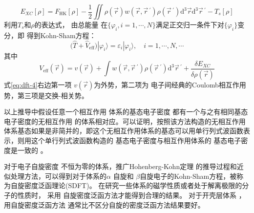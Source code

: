 \begin{equation} 
  \label{eq:dft-2}
  E_{XC}[\rho]=F_{\mathrm{HK}}[\rho]-\frac 12\iint{\rho(\vec{r}) w(\vec{r},\vec r\,^{\prime})\rho(\vec r\,^{\prime})\textrm{d}^3\vec{r}\textrm{d}^3\vec r\,^{\prime}}-T_{s}[\rho]
\end{equation}
利用$T_s$和$\rho$的表达式，%
{由}总能量%
{在$\{\varphi_i, i\!=\!1,\cdots, N\}$满足正交归一条件下对$\{\varphi_i\}$}变分，即%
得到Kohn-Sham方程：
\begin{equation} \label{eq:dft-3}
	\bigl(\hat{T}+\hat{V}_{\mathrm{eff}}\bigr)|\varphi_{i}\rangle=\varepsilon_{i}|\varphi_{i}\rangle{,\quad i=1,\cdots,N,\cdots}
\end{equation}
其中
\begin{equation} \label{eq:dft-4}
	V_{\mathrm{eff}}(\vec{r})={v}(\vec{r})+\int{w(\vec{r},\vec r\,^{\prime})\rho(\vec r\,^{\prime})\textrm{d}^3{\vec r\,^{\prime}}+\frac{\delta E_{XC}}{\delta\rho(\vec{r})
}}
\end{equation}
式\eqref{eq:dft-4}右边第一项%
${v}(\vec{r})
$为外势，第二项为%
{电}子间经典的{Coulomb}相互作用势，第三项是交换-相关势。%

以上推导中假设任意一个相互作用%
{体系的基态电}子密度%
{都有一个}与之有相同基态电子密度的无相互作用%
{的体系相对应}。可以证明，按照该方法构造的无相互作用体系基态如果是非简并的，即这个无相互作用体系的基态可以用单行列式波函数表示，则用这个单行列式波函数构造的%
{基态电}子密度与相互作用体系的%
{基态电}子密度是一致的%
。\cite{PNAS76-6062_1979,IJQC24-243_1983}

对于{电子}自旋{密度}%
{不恒为零的体系，推广}Hohenberg-Kohn定理%
{的推导过程和近似处理方法，可以得到对于体系的}$\alpha$%
自旋和%
{$\beta$自旋}电子的{\textrm{Kohn-Sham}方程，被称为自旋密度泛函理论\textrm{(SDFT)}。}%
{在}研究一些体系的磁学性质或者处于解离极限的分子的性质{时}，%
采用%
自旋密度泛函方法才能得到合理的结果{。}%
对于开壳层体系%
，用自旋密度泛函方法%
通常比不{区}分自旋的密度泛函方法结果要好。%

